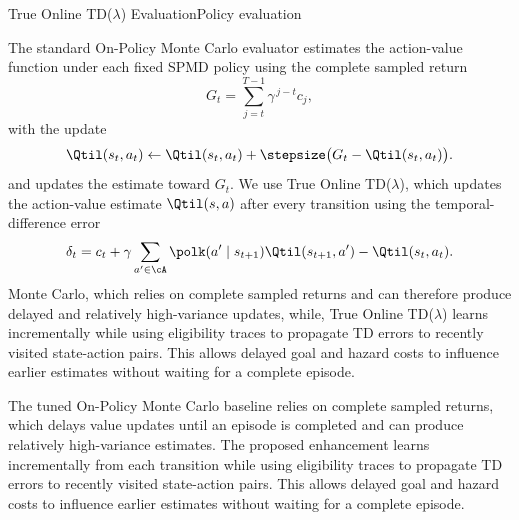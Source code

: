 \documentclass[11pt]{article}
\begin{document}
\begin{enhancement}{True Online TD(\texorpdfstring{$\lambda$}{lambda}) Evaluation}{Policy evaluation}

The standard On-Policy Monte Carlo  evaluator estimates the action-value
function under each fixed SPMD policy using the complete sampled return
\[
G_t
=
\sum_{j=t}^{T-1} \gamma^{\,j-t} c_j,
\]
with the update
\[
\Qtil(s_t,a_t)
\leftarrow
\Qtil(s_t,a_t)
+
\stepsize\bigl(G_t-\Qtil(s_t,a_t)\bigr).
\]
and updates the estimate toward $G_t$. We use True Online TD($\lambda$),
which updates the action-value estimate $\Qtil(s,a)$ after every transition using
the temporal-difference error
\[
\delta_t
=
c_t
+\gamma
\sum_{a' \in \cA}
\polk(a' \mid s_{t+1}) \Qtil(s_{t+1},a')
-\Qtil(s_t,a_t).
\]
Monte Carlo, which relies on complete sampled returns and can therefore produce
delayed and relatively high-variance updates, while, True Online TD($\lambda$) learns
incrementally while using eligibility traces to propagate TD errors to recently
visited state-action pairs. This allows delayed goal and hazard costs to
influence earlier estimates without waiting for a complete episode.

 The tuned On-Policy Monte Carlo baseline relies on complete sampled returns, which delays value updates until an episode is completed and can produce relatively high-variance estimates. The proposed enhancement learns incrementally from each transition while using eligibility traces to propagate TD errors to recently visited state-action pairs. This allows delayed goal and hazard costs to influence earlier estimates without waiting for a complete episode. 



\end{enhancement}
\end{document}
